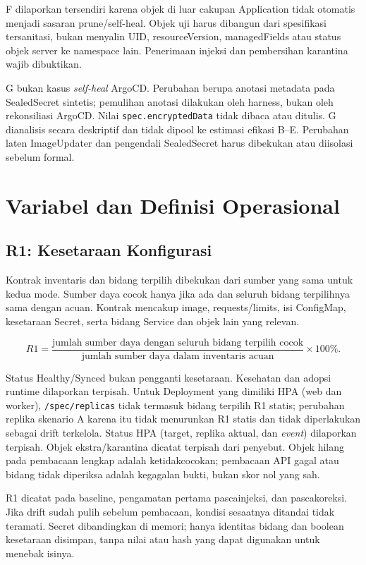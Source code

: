 F dilaporkan tersendiri karena objek di luar cakupan Application tidak otomatis menjadi sasaran prune/self-heal. Objek uji harus dibangun dari spesifikasi tersanitasi, bukan menyalin UID, resourceVersion, managedFields atau status objek server ke namespace lain. Penerimaan injeksi dan pembersihan karantina wajib dibuktikan.

G bukan kasus \textit{self-heal} ArgoCD. Perubahan berupa anotasi metadata pada SealedSecret sintetis; pemulihan anotasi dilakukan oleh harness, bukan oleh rekonsiliasi ArgoCD. Nilai \texttt{spec.encryptedData} tidak dibaca atau ditulis. G dianalisis secara deskriptif dan tidak dipool ke estimasi efikasi B--E. Perubahan laten ImageUpdater dan pengendali SealedSecret harus dibekukan atau diisolasi sebelum formal.

\section{Variabel dan Definisi Operasional}

\subsection{R1: Kesetaraan Konfigurasi}

Kontrak inventaris dan bidang terpilih dibekukan dari sumber yang sama untuk kedua mode. Sumber daya cocok hanya jika ada dan seluruh bidang terpilihnya sama dengan acuan. Kontrak mencakup image, requests/limits, isi ConfigMap, kesetaraan Secret, serta bidang Service dan objek lain yang relevan.

\[
R1 = \frac{\text{jumlah sumber daya dengan seluruh bidang terpilih cocok}}{\text{jumlah sumber daya dalam inventaris acuan}} \times 100\%.
\]

Status Healthy/Synced bukan pengganti kesetaraan. Kesehatan dan adopsi runtime dilaporkan terpisah. Untuk Deployment yang dimiliki HPA (web dan worker), \texttt{/spec/replicas} tidak termasuk bidang terpilih R1 statis; perubahan replika skenario A karena itu tidak menurunkan R1 statis dan tidak diperlakukan sebagai drift terkelola. Status HPA (target, replika aktual, dan \textit{event}) dilaporkan terpisah. Objek ekstra/karantina dicatat terpisah dari penyebut. Objek hilang pada pembacaan lengkap adalah ketidakcocokan; pembacaan API gagal atau bidang tidak diperiksa adalah kegagalan bukti, bukan skor nol yang sah.

R1 dicatat pada baseline, pengamatan pertama pascainjeksi, dan pascakoreksi. Jika drift sudah pulih sebelum pembacaan, kondisi sesaatnya ditandai tidak teramati. Secret dibandingkan di memori; hanya identitas bidang dan boolean kesetaraan disimpan, tanpa nilai atau hash yang dapat digunakan untuk menebak isinya.

